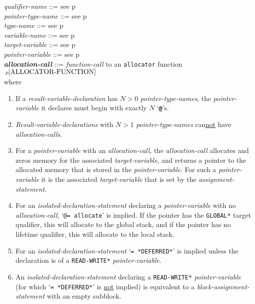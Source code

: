 \documentclass[12pt]{article}
\newcommand{\TT}[1]{{\tt \bfseries #1}}
\newcommand{\emkey}[1]{{\em \bfseries #1}}
\newcommand{\pagref}[1]{p\pageref{#1}}
\newcommand{\pagnote}[1]{$\,^{p\pageref{#1}}$}
\newenvironment{indpar}[1][0.3in]%
	{\begin{list}{}%
		     {\setlength{\itemsep}{0in}%
		      \setlength{\topsep}{0in}%
		      \setlength{\parsep}{1ex}%
		      \setlength{\labelwidth}{#1}%
		      \setlength{\leftmargin}{#1}%
		      \addtolength{\leftmargin}{\labelsep}}%
	 \item}%
	{\end{list}}
\begin{document}
\begin{indpar}
{\em qualifier-name} ::= see \pagref{QUALIFIER-NAME}
\\[0.5ex]
{\em pointer-type-name} ::= see \pagref{POINTER-TYPE-NAME}
\\[0.5ex]
{\em type-name} ::= see \pagref{TYPE-NAME}
\\[0.5ex]
{\em variable-name} ::= see \pagref{VARIABLE-NAME}
\\[0.5ex]
{\em target-variable} ::= see \pagref{TARGET-VARIABLE}
\\[0.5ex]
{\em pointer-variable} ::= see \pagref{POINTER-VARIABLE}
\\[0.5ex]
\emkey{allocation-call}\label{ALLOCATION-CALL} ::=
    {\em function-call} to
    an {\tt allocator} function\pagnote{ALLOCATOR-FUNCTION}
\\[2ex]
where
\begin{enumerate}
\item If a {\em result-variable-declaration}
has $N>0$ {\em pointer-type-names}, the {\em pointer-variable}
it declares must begin with exactly $N$ `\TT{@}'s.
\item {\em Result-variable-declarations}
with $N>1$ {\em pointer-type-names} can\underline{not} have
{\em alloca\-tion-calls}.
\item For a {\em pointer-variable} with an {\em allocation-call},
the {\em allocation-call} allocates and zeros memory for the
associated {\em target-variable}, and returns a pointer to the
allocated memory that is stored in the {\em pointer-variable}.
For such a {\em pointer-variable} it is the
associated {\em target-variable} that is set by the {\em assignment-statement}.
\item For an {\em isolated-declaration-statement} declaring a
{\em pointer-variable} with no {\em alloca\-tion-call},
`{\tt @= allocate}' is implied.  If the pointer has the {\tt *GLOBAL*}
target qualifier, this will allocate to the global stack, and if
the pointer has no lifetime qualifier, this will allocate to the local stack.
\item For an {\em isolated-declaration-statement} `{\tt = *DEFERRED*}'
is implied unless the declaration is of a {\tt *READ-WRITE*}
{\em pointer-variable}.
\item An {\em isolated-declaration-statement} declaring a
{\tt *READ-WRITE*} {\em pointer-variable} (for which
`{\tt = *DEFERRED*}' is \underline{not} implied) is equivalent
to a {\em block-assignment-statement} with an empty subblock.
\end{enumerate}

\end{indpar}
\end{document}
